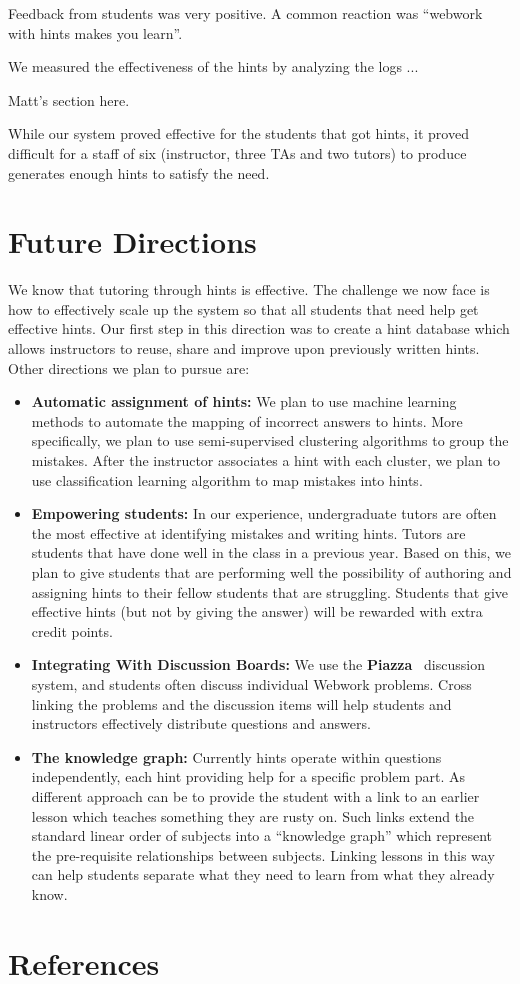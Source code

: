 \documentclass{sigchi}
\begin{document}
Feedback from students was very positive. A common reaction was
``webwork with hints makes you learn''.

We measured the effectiveness of the hints by analyzing the logs ...

Matt's section here.

While our system proved effective for the students that got hints, it
proved difficult for a staff of six (instructor, three TAs and two
tutors) to produce generates enough hints to satisfy the need.

\section{Future Directions}
We know that tutoring through hints is effective. The challenge we now
face is how to effectively scale up the system so that all students
that need help get effective hints. Our first step in this direction
was to create a hint database which allows instructors to reuse, share
and improve upon previously written hints. Other directions we plan to
pursue are:
\begin{itemize}
\item {\bf Automatic assignment of hints:} We plan to use machine
  learning methods to automate the mapping of incorrect answers to
  hints. More specifically, we plan to use semi-supervised clustering
  algorithms to group the mistakes. After the instructor associates a
  hint with each cluster, we plan to use classification learning
  algorithm to map mistakes into hints.
\item {\bf Empowering students:} In our experience, undergraduate
  tutors are often the most effective at identifying mistakes and
  writing hints. Tutors are students that have done well in the class
  in a previous year. Based on this, we plan to give students that are
  performing well the possibility of authoring and assigning hints to
  their fellow students that are struggling. Students that give
  effective hints (but not by giving the answer) will be rewarded with
  extra credit points. 
\item {\bf Integrating With Discussion Boards:} We use the {\bf
  Piazza}~\cite{Piazza} discussion system, and students often discuss
  individual Webwork problems. Cross linking the problems and the
  discussion items will help students and instructors effectively
  distribute questions and answers.
\item {\bf The knowledge graph:} Currently hints operate within
  questions independently, each hint providing help for a specific
  problem part. As different approach can be to provide the student
  with a link to an earlier lesson which teaches something they are
  rusty on. Such links extend the standard linear order of subjects
  into a ``knowledge graph'' which represent the pre-requisite
  relationships between subjects. Linking lessons in this way can help
  students separate what they need to learn from what they already
  know.
\end{itemize}

\section{References}



\end{document}
